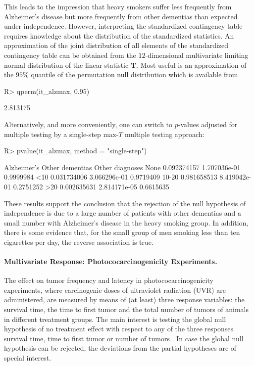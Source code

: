 \documentclass{article}
\newcommand{\T}{\mathbf{T}}
\newenvironment{Schunk}{}{}
\begin{document}
This leads to the impression that heavy smokers suffer less frequently
from Alzheimer's disease but more frequently from other dementias
than expected under independence.
However, interpreting the standardized contingency table requires
knowledge about the distribution of the standardized statistics. An
approximation of the joint distribution of all elements of the standardized
contingency table can be obtained from the
$12$-dimensional
multivariate limiting normal distribution of the linear statistic $\T$. Most
useful is an approximation of the $95\%$ quantile of the permutation 
null distribution which is available from
\begin{Schunk}
\begin{Sinput}
R> qperm(it_alzmax, 0.95)
\end{Sinput}
\begin{Soutput}
[1] 2.813175
\end{Soutput}
\end{Schunk}
Alternatively, and more conveniently, one can
switch to $p$-values adjusted for multiple testing by a single-step max-$T$
multiple testing approach:
\begin{Schunk}
\begin{Sinput}
R> pvalue(it_alzmax, method = "single-step")
\end{Sinput}
\begin{Soutput}
      Alzheimer's Other dementias Other diagnoses
None  0.092374157    1.707036e-01       0.9999984
<10   0.031734006    3.066296e-01       0.9719409
10-20 0.981658513    8.419042e-01       0.2751252
>20   0.002635631    2.814171e-05       0.6615635
\end{Soutput}
\end{Schunk}
These results support the conclusion that the rejection of the 
null hypothesis of independence is due to a large number of patients
with other dementias and a small number with Alzheimer's disease in the heavy
smoking group. In addition, there is some evidence that, for the small
group of men smoking less than ten cigarettes per day, the reverse
association is true.

\paragraph{Multivariate Response: Photococarcinogenicity Experiments.}

The effect on tumor frequency and latency in photococarcinogenicity
experiments, where carcinogenic doses of ultraviolet radiation (UVR) are
administered, are measured by means of (at least) three response variables:
the survival time, the time to first tumor and the total number of tumors of
animals in different treatment groups. 
The main interest is testing the global null hypothesis of no treatment 
effect with respect to any of the three responses survival time, time to first tumor or
number of tumors \citep[][analyze the detection time
of tumors in addition, this data is not given here]{Molefeetal2005}. 
In case the  global null hypothesis can be rejected, the deviations 
from the partial hypotheses are of special interest.
\end{document}
